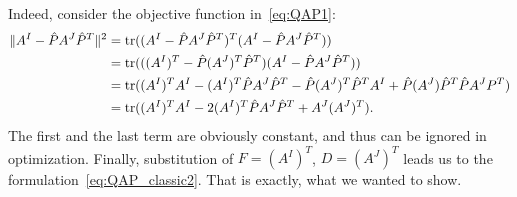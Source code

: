 Indeed, consider the objective function in~\eqref{eq:QAP1}:
\begin{align*}
\|A^I-\hat{P}A^J\hat{P}^T\|^2 &= \mathop{\rm tr}((A^I-\hat{P}A^J\hat{P}^T)^T(A^I-\hat{P}A^J\hat{P}^T)) \notag\\
							  &= \mathop{\rm tr}(((A^I)^T-\hat{P}(A^J)^T\hat{P}^T)(A^I-\hat{P}A^J\hat{P}^T)) \notag\\
							  &= \mathop{\rm tr}((A^I)^TA^I-(A^I)^T\hat{P}A^J\hat{P}^T-\hat{P}(A^J)^T\hat{P}^TA^I+\hat{P}(A^J)\hat{P}^T\hat{P}A^JP^T) \notag\\
							  &= \mathop{\rm tr}((A^I)^TA^I-2(A^I)^T\hat{P}A^J\hat{P}^T+A^J(A^J)^T).
\end{align*}
The first and the last term are obviously constant, and thus can be ignored in optimization. Finally, substitution of $F=(A^I)^T$, $D=(A^J)^T$ leads us to the formulation~\eqref{eq:QAP_classic2}. That is exactly, what we wanted to show.



